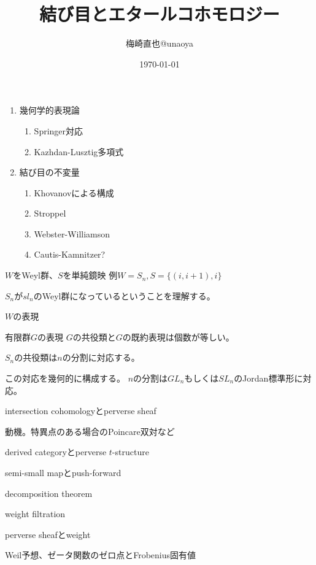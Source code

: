 \documentclass[dvipdfmx]{beamer}
\title{結び目とエタールコホモロジー}
\author{梅崎直也@unaoya}
\date{\today}
\begin{document}
\begin{frame}
\maketitle
\end{frame}

\begin{frame}
\begin{enumerate}
\item 幾何学的表現論
\begin{enumerate}
\item Springer対応
\item Kazhdan-Lusztig多項式
\end{enumerate}
\item 結び目の不変量
\begin{enumerate}
\item Khovanovによる構成
\item Stroppel
\item Webster-Williamson
\item Cautis-Kamnitzer?
\end{enumerate}
\end{enumerate}
\end{frame}

\begin{frame}
$W$をWeyl群、$S$を単純鏡映
例$W=S_n, S=\{(i,i+1),i\}$

$S_n$が$sl_n$のWeyl群になっているということを理解する。

$W$の表現

有限群$G$の表現
$G$の共役類と$G$の既約表現は個数が等しい。

$S_n$の共役類は$n$の分割に対応する。

この対応を幾何的に構成する。
$n$の分割は$GL_n$もしくは$SL_n$のJordan標準形に対応。
\end{frame}

\begin{frame}
intersection cohomologyとperverse sheaf

動機。特異点のある場合のPoincare双対など

derived categoryとperverse $t$-structure

semi-small mapとpush-forward

decomposition theorem

weight filtration

perverse sheafとweight

Weil予想、ゼータ関数のゼロ点とFrobenius固有値
\end{frame}
\end{document}
